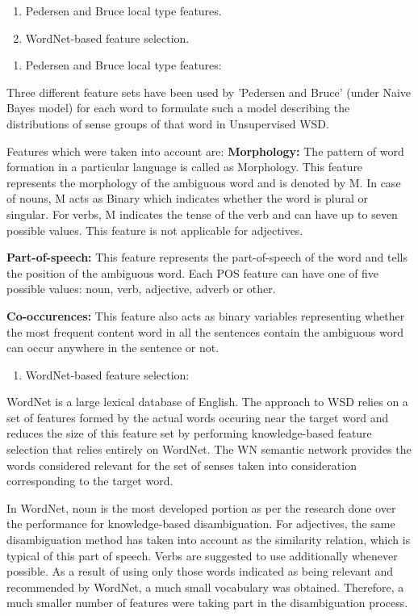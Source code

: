 \begin{enumerate}
	\item Pedersen and Bruce local type features.
	\item WordNet-based feature selection.
\end{enumerate}

\begin{enumerate}
	\item Pedersen and Bruce local type features:
\end{enumerate}
Three different feature sets have been used by 'Pedersen and Bruce' (under Naive Bayes model) for each word to formulate such 
a model describing the distributions of sense groups of that word in Unsupervised WSD.

Features which were taken into account are:
\textbf{Morphology:} The pattern of word formation in a particular language is called as Morphology.
This feature represents the morphology \cite{5494927} of the ambiguous word and is denoted by M. 
In case of nouns, M acts as Binary which indicates whether the word is plural or singular.
For verbs, M indicates the tense of the verb and can have up to seven possible values.
This feature is not applicable for adjectives.

\textbf{Part-of-speech:} This feature represents the part-of-speech \cite{6982457} of the word and tells the position of the ambiguous word.
Each POS feature can have one of five possible values: noun, verb, adjective, adverb or other.

\textbf{Co-occurences:} This feature also acts as binary variables representing whether the most frequent content word in all the sentences contain the ambiguous word can occur anywhere in the sentence or not.

\begin{enumerate}
	\item WordNet-based feature selection:
\end{enumerate}
WordNet is a large lexical database of English. 
The approach to WSD relies on a set of features formed by the actual words occuring near the target word and 
reduces the size of this feature set by performing knowledge-based feature selection that relies entirely on WordNet.
The WN semantic network provides the words considered relevant for the set of senses taken into consideration corresponding 
to the target word.

In WordNet, noun is the most developed portion as per the research done over the performance for knowledge-based disambiguation.
For adjectives, the same disambiguation method has taken into account as the similarity relation, which  is typical of this 
part of speech.
Verbs are suggested to use additionally whenever possible.
As a result of using only those words indicated as being relevant and recommended by WordNet, a much small vocabulary was obtained.
Therefore, a much smaller number of features were taking part in the disambiguation process.

